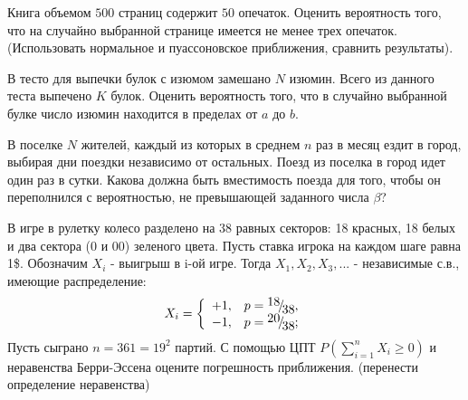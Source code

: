 \begin{problem}
Книга объемом $500$ страниц содержит $50$ опечаток. Оценить вероятность того, что на случайно выбранной странице 
имеется не менее трех опечаток. (Использовать нормальное и пуассоновское приближения, сравнить результаты). 
\end{problem}

\begin{problem}
В тесто для выпечки булок с изюмом замешано $N$ изюмин. Всего из данного теста выпечено $K$ булок. Оценить вероятность того, 
что в случайно выбранной булке число изюмин находится в пределах от $a$ до $b$. 
\end{problem}

\begin{problem}
В поселке $N$ жителей, каждый из которых в среднем $n$ раз в месяц ездит в город, выбирая дни поездки независимо от остальных. 
Поезд из поселка в город идет один раз в сутки. Какова должна быть вместимость поезда для того, чтобы он переполнился с вероятностью, 
не превышающей заданного числа $\beta$? 
\end{problem}

\begin{problem}
В игре в рулетку колесо разделено на 38 равных секторов: 18 красных, 18 белых и два сектора (0 и 00) зеленого цвета. Пусть ставка игрока на каждом шаге равна 1\$. Обозначим $X_{i} $ - выигрыш в i-ой игре. Тогда $X_{1} ,X_{2} ,X_{3} ,...$ - независимые с.в., имеющие распределение: 
\[X_{i} =\left\{\begin{array}{cc} {+1,} & {p={\raise0.7ex\hbox{$ 18 $}\!\mathord{\left/ {\vphantom {18 38}} \right. \kern-\nulldelimiterspace}\!\lower0.7ex\hbox{$ 38 $}} ,} \\ {-1,} & {p={\raise0.7ex\hbox{$ 20 $}\!\mathord{\left/ {\vphantom {20 38}} \right. \kern-\nulldelimiterspace}\!\lower0.7ex\hbox{$ 38 $}} ;} \end{array}\right. \] 
Пусть сыграно $n=361=19^{2} $ партий. С помощью ЦПТ $P\left(\sum _{i=1}^{n}X_{i}  \ge 0\right)$ и  неравенства Берри-Эссена оцените погрешность приближения. (перенести определение неравенства)
\end{problem}

